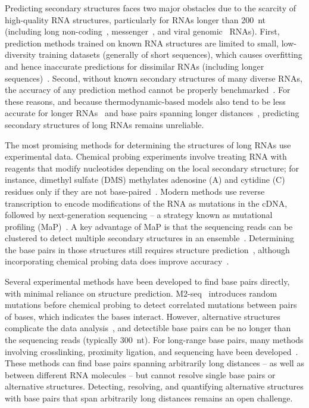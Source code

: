 \documentclass[main.tex]{subfiles}
\begin{document}
Predicting secondary structures faces two major obstacles due to the scarcity of high-quality RNA structures, particularly for RNAs longer than 200~nt (including long non-coding~\cite{Quinn2016}, messenger~\cite{Lange2012}, and viral genomic~\cite{Nicholson2015} RNAs).
First, prediction methods trained on known RNA structures are limited to small, low-diversity training datasets (generally of short sequences), which causes overfitting and hence inaccurate predictions for dissimilar RNAs (including longer sequences)~\cite{Flamm2022,Sato2023}.
Second, without known secondary structures of many diverse RNAs, the accuracy of any prediction method cannot be properly benchmarked~\cite{Lange2012,Mathews2019}.
For these reasons, and because thermodynamic-based models also tend to be less accurate for longer RNAs~\cite{Nicholson2015} and base pairs spanning longer distances~\cite{Doshi2004}, predicting secondary structures of long RNAs remains unreliable.

The most promising methods for determining the structures of long RNAs use experimental data.
Chemical probing experiments involve treating RNA with reagents that modify nucleotides depending on the local secondary structure; for instance, dimethyl sulfate (DMS) methylates adenosine (A) and cytidine (C) residues only if they are not base-paired~\cite{Kubota2015}.
Modern methods use reverse transcription to encode modifications of the RNA as mutations in the cDNA, followed by next-generation sequencing -- a strategy known as mutational profiling (MaP)~\cite{Siegfried2014,Zubradt2016}.
A key advantage of MaP is that the sequencing reads can be clustered to detect multiple secondary structures in an ensemble~\cite{Tomezsko2020,Morandi2021}.
Determining the base pairs in those structures still requires structure prediction~\cite{Mathews2004a}, although incorporating chemical probing data does improve accuracy~\cite{Cordero2012,Sloma2015}.

Several experimental methods have been developed to find base pairs directly, with minimal reliance on structure prediction.
M2-seq~\cite{Cheng2017} introduces random mutations before chemical probing to detect correlated mutations between pairs of bases, which indicates the bases interact.
However, alternative structures complicate the data analysis~\cite{Cordero2015}, and detectible base pairs can be no longer than the sequencing reads (typically 300~nt).
For long-range base pairs, many methods involving crosslinking, proximity ligation, and sequencing have been developed~\cite{Kudla2020}.
These methods can find base pairs spanning arbitrarily long distances -- as well as between different RNA molecules -- but cannot resolve single base pairs or alternative structures.
Detecting, resolving, and quantifying alternative structures with base pairs that span arbitrarily long distances remains an open challenge.
\end{document}
